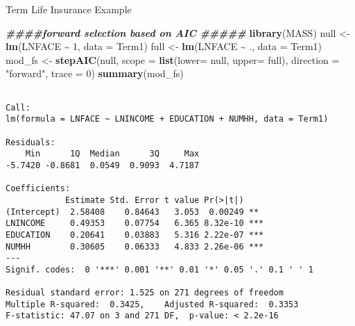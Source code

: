 \documentclass[
  ignorenonframetext,
]{beamer}
\newenvironment{Shaded}{\begin{snugshade}}{\end{snugshade}}
\newcommand{\AttributeTok}[1]{\textcolor[rgb]{0.13,0.29,0.53}{#1}}
\newcommand{\DecValTok}[1]{\textcolor[rgb]{0.00,0.00,0.81}{#1}}
\newcommand{\DocumentationTok}[1]{\textcolor[rgb]{0.56,0.35,0.01}{\textbf{\textit{#1}}}}
\newcommand{\FunctionTok}[1]{\textcolor[rgb]{0.13,0.29,0.53}{\textbf{#1}}}
\newcommand{\NormalTok}[1]{#1}
\newcommand{\OtherTok}[1]{\textcolor[rgb]{0.56,0.35,0.01}{#1}}
\newcommand{\SpecialCharTok}[1]{\textcolor[rgb]{0.81,0.36,0.00}{\textbf{#1}}}
\newcommand{\StringTok}[1]{\textcolor[rgb]{0.31,0.60,0.02}{#1}}
\begin{document}
\begin{frame}[fragile]{Term Life Insurance Example}
\protect\hypertarget{term-life-insurance-example-5}{}
\tiny

\begin{Shaded}
\begin{Highlighting}[]
\DocumentationTok{\#\#\#\#forward selection based on AIC \#\#\#\#\#}
\FunctionTok{library}\NormalTok{(MASS)}
\NormalTok{null }\OtherTok{\textless{}{-}} \FunctionTok{lm}\NormalTok{(LNFACE  }\SpecialCharTok{\textasciitilde{}} \DecValTok{1}\NormalTok{, }\AttributeTok{data =}\NormalTok{ Term1)}
\NormalTok{full }\OtherTok{\textless{}{-}} \FunctionTok{lm}\NormalTok{(LNFACE }\SpecialCharTok{\textasciitilde{}}\NormalTok{ ., }\AttributeTok{data =}\NormalTok{ Term1)}
\NormalTok{mod\_fs }\OtherTok{\textless{}{-}} \FunctionTok{stepAIC}\NormalTok{(null, }\AttributeTok{scope =} \FunctionTok{list}\NormalTok{(}\AttributeTok{lower=}\NormalTok{ null, }\AttributeTok{upper=}\NormalTok{ full), }
                  \AttributeTok{direction =} \StringTok{"forward"}\NormalTok{, }\AttributeTok{trace =} \DecValTok{0}\NormalTok{)}
\FunctionTok{summary}\NormalTok{(mod\_fs)}
\end{Highlighting}
\end{Shaded}

\begin{verbatim}

Call:
lm(formula = LNFACE ~ LNINCOME + EDUCATION + NUMHH, data = Term1)

Residuals:
    Min      1Q  Median      3Q     Max 
-5.7420 -0.8681  0.0549  0.9093  4.7187 

Coefficients:
            Estimate Std. Error t value Pr(>|t|)    
(Intercept)  2.58408    0.84643   3.053  0.00249 ** 
LNINCOME     0.49353    0.07754   6.365 8.32e-10 ***
EDUCATION    0.20641    0.03883   5.316 2.22e-07 ***
NUMHH        0.30605    0.06333   4.833 2.26e-06 ***
---
Signif. codes:  0 '***' 0.001 '**' 0.01 '*' 0.05 '.' 0.1 ' ' 1

Residual standard error: 1.525 on 271 degrees of freedom
Multiple R-squared:  0.3425,    Adjusted R-squared:  0.3353 
F-statistic: 47.07 on 3 and 271 DF,  p-value: < 2.2e-16
\end{verbatim}

\normalsize
\end{frame}
\end{document}
